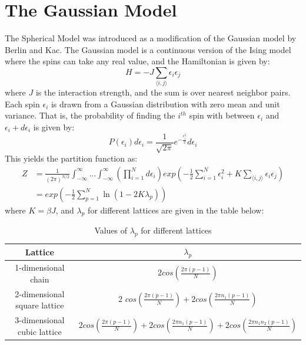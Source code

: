 \documentclass{article}
\begin{document}
\section{The Gaussian Model}
The Spherical Model was introduced as a modification of the Gaussian model by Berlin and Kac. The Gaussian model is a continuous version of the Ising model where the spins can take any real value, and the Hamiltonian is given by:
\begin{equation}
    H = -J \sum_{\langle i,j \rangle} \epsilon_i \epsilon_j
\end{equation}
where $J$ is the interaction strength, and the sum is over nearest neighbor pairs. Each spin $\epsilon_i$ is drawn from a Gaussian distribution with zero mean and unit variance. That is, the probability of finding the $i^{th}$ spin with between $\epsilon_i$ and $\epsilon_i + d\epsilon_i$ is given by:
\begin{equation}
    P(\epsilon_i) d\epsilon_i = \frac{1}{\sqrt{2\pi}} e^{-\frac{\epsilon_i^2}{2}} d\epsilon_i
\end{equation}
This yields the partition function as:
\begin{align}
    Z &=  \frac{1}{(2\pi)^{N/2}} \int_{-\infty}^{\infty} \ldots \int_{-\infty}^{\infty} \left( \prod_{i=1}^{N} d\epsilon_i \right) exp \left( -\frac{1}{2} \sum_{i=1}^{N} \epsilon_i^2 + K \sum_{\langle i,j \rangle} \epsilon_i \epsilon_j \right) \\
     & = exp \left( -\frac{1}{2} \sum_{p=1}^{N} \ln(1 - 2 K \lambda_p) \right)
\end{align}
where $K = \beta J$, and $\lambda_p$ for different lattices are given in the table below:
\begin{table}[h!]
    \centering
    \begin{tabular}{|c|c|}
        \hline
        Lattice & $\lambda_p$ \\
        \hline \hline
        1-dimensional chain & $2 cos\left(\frac{2 \pi (p-1)}{N} \right)$ \\
        \hline
        2-dimensional square lattice & 2 $cos\left(\frac{2 \pi (p-1)}{N} \right) + 2 cos\left(\frac{2 \pi n_1 (p-1) }{N} \right)$ \\
        \hline
        3-dimensional cubic lattice & $2 cos\left(\frac{2 \pi (p-1)}{N} \right) + 2 cos\left(\frac{2 \pi n_1 (p-1) }{N} \right) + 2 cos\left(\frac{2 \pi n_1 n_2 (p-1) }{N} \right)$ \\
        \hline
    \end{tabular}
    \caption{Values of $\lambda_p$ for different lattices}
    \label{tab:lambda}
\end{table}
\end{document}
